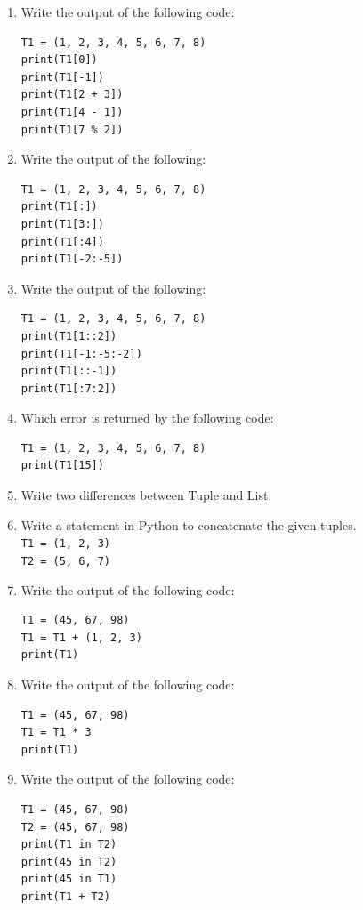 \documentclass[11pt,a4paper]{article}
\begin{document}
\begin{enumerate}[label=\textbf{Q\arabic*.}]
\item Write the output of the following code:
\begin{lstlisting}
T1 = (1, 2, 3, 4, 5, 6, 7, 8)
print(T1[0])
print(T1[-1])
print(T1[2 + 3])
print(T1[4 - 1])
print(T1[7 % 2])
\end{lstlisting}

\item Write the output of the following:
\begin{lstlisting}
T1 = (1, 2, 3, 4, 5, 6, 7, 8)
print(T1[:])
print(T1[3:])
print(T1[:4])
print(T1[-2:-5])
\end{lstlisting}

\item Write the output of the following:
\begin{lstlisting}
T1 = (1, 2, 3, 4, 5, 6, 7, 8)
print(T1[1::2])
print(T1[-1:-5:-2])
print(T1[::-1])
print(T1[:7:2])
\end{lstlisting}

\item Which error is returned by the following code:
\begin{lstlisting}
T1 = (1, 2, 3, 4, 5, 6, 7, 8)
print(T1[15])
\end{lstlisting}

\item Write two differences between Tuple and List.

\item Write a statement in Python to concatenate the given tuples.\\
\texttt{T1 = (1, 2, 3)}\\
\texttt{T2 = (5, 6, 7)}

\item Write the output of the following code:
\begin{lstlisting}
T1 = (45, 67, 98)
T1 = T1 + (1, 2, 3)
print(T1)
\end{lstlisting}

\item Write the output of the following code:
\begin{lstlisting}
T1 = (45, 67, 98)
T1 = T1 * 3
print(T1)
\end{lstlisting}

\item Write the output of the following code:
\begin{lstlisting}
T1 = (45, 67, 98)
T2 = (45, 67, 98)
print(T1 in T2)
print(45 in T2)
print(45 in T1)
print(T1 + T2)
\end{lstlisting}


\end{enumerate}
\end{document}
